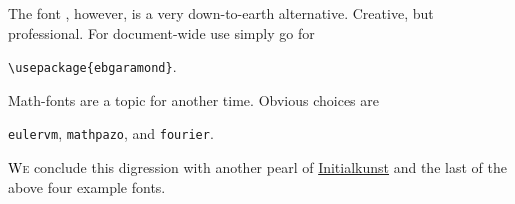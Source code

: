 {\reasonablefont The font , however, is a very down-to-earth alternative. Creative, but professional. For document-wide use simply go for 
	
	{\centering \verb|\usepackage{ebgaramond}|.\par}

}
Math-fonts are a topic for another time. Obvious choices are 

{\centering \verb|eulervm|, \verb|mathpazo|, and \verb|fourier|.\par} 

\lettrine[lines=3, loversize=0.1]{\textcolor{black}{\Examplefontiv W}}{e} conclude this digression with another pearl of \href{https://www.ziereis-faksimiles.de/}{Initialkunst} and the last of the above four example fonts.

